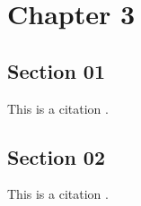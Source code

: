 \chapter{Chapter 3}
\lipsum[1-3]
\section{Section 01}
This is a citation \cite{grand}.
\lipsum[2-5]

\section{Section 02}
This is a citation \cite{grand}.
\lipsum[2-3]